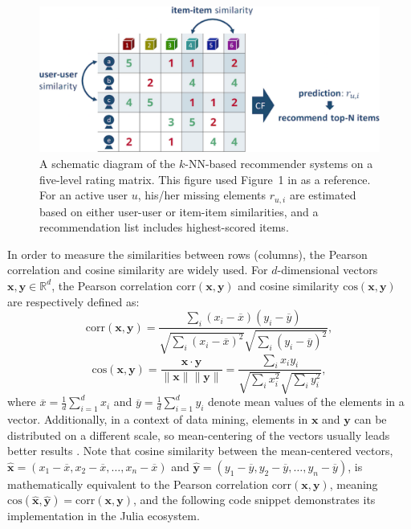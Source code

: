 \begin{figure}[htbp]
  \centering
  \includegraphics[width=1.0\linewidth]{images/cf.pdf}
  \caption{A schematic diagram of the $k$-NN-based recommender systems on a five-level rating matrix. This figure used Figure~1 in \cite{Sarwar2001} as a reference. For an active user $u$, his/her missing elements $r_{u,i}$ are estimated based on either user-user or item-item similarities, and a recommendation list includes highest-scored items.}
  \label{fig:cf}
\end{figure}

In order to measure the similarities between rows (columns), the Pearson correlation and cosine similarity are widely used. For $d$-dimensional vectors $\mathbf{x}, \mathbf{y} \in \mathbb{R}^d$, the Pearson correlation $\mathrm{corr}(\mathbf{x}, \mathbf{y})$ and cosine similarity $\mathrm{cos}(\mathbf{x}, \mathbf{y})$ are respectively defined as:
$$
\mathrm{corr}(\mathbf{x}, \mathbf{y}) = \frac{\sum_i (x_{i} - \overline{x})(y_{i} - \overline{y})}{\sqrt{\sum_i (x_{i} - \overline{x})^2} \sqrt{\sum_i (y_{i} - \overline{y})^2}},
$$
$$
\mathrm{cos}(\mathbf{x}, \mathbf{y}) = \frac{\mathbf{x} \cdot \mathbf{y}}{\| \mathbf{x} \| \| \mathbf{y} \|} = \frac{\sum_i x_{i} y_{i}}{\sqrt{\sum_i x_{i}^2} \sqrt{\sum_i y_{i}^2}},
$$
where $\overline{x} = \frac{1}{d} \sum^d_{i=1} x_i$ and $\overline{y} = \frac{1}{d} \sum^d_{i=1} y_i$ denote mean values of the elements in a vector. Additionally, in a context of data mining, elements in $\mathbf{x}$ and $\mathbf{y}$ can be distributed on a different scale, so mean-centering of the vectors usually leads better results \cite{Sarwar2001}. Note that cosine similarity between the mean-centered vectors, $\hat{\mathbf{x}} = (x_1 - \overline{x}, x_2 - \overline{x}, \dots, x_n - \overline{x})$ and $\hat{\mathbf{y}} = (y_1 - \overline{y}, y_2 - \overline{y}, \dots, y_n - \overline{y})$, is mathematically equivalent to the Pearson correlation $\mathrm{corr}(\mathbf{x}, \mathbf{y})$, meaning $\mathrm{cos}(\hat{\mathbf{x}}, \hat{\mathbf{y}}) = \mathrm{corr}(\mathbf{x}, \mathbf{y})$, and the following code snippet demonstrates its implementation in the Julia ecosystem.

